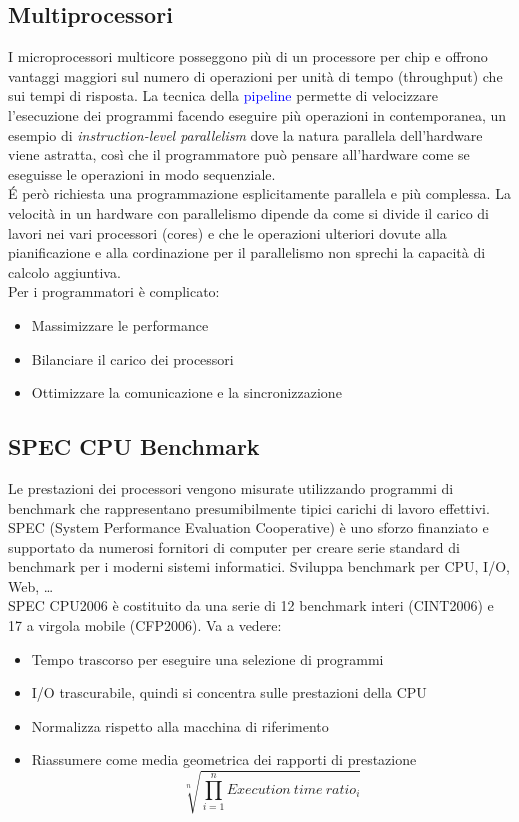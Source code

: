 \documentclass[12pt,a4paper]{article}
\begin{document}
\subsection{Multiprocessori}
I microprocessori multicore posseggono più di un processore per chip e offrono vantaggi maggiori sul numero di operazioni per unità di tempo (throughput) che sui tempi di risposta. La tecnica della \textcolor{blue}{pipeline} permette di velocizzare l'esecuzione dei programmi facendo eseguire più operazioni in contemporanea, un esempio di \textit{instruction-level parallelism} dove la natura parallela dell'hardware viene astratta, così che il programmatore può pensare all'hardware come se eseguisse le operazioni in modo sequenziale. \\
\'E però richiesta una programmazione esplicitamente parallela e più complessa. La velocità in un hardware con parallelismo dipende da come si divide il carico di lavori nei vari processori (cores) e che le operazioni ulteriori dovute alla pianificazione e alla cordinazione per il parallelismo non sprechi la capacità di calcolo aggiuntiva.\\
Per i programmatori è complicato:\begin{itemize}
\item Massimizzare le performance
\item Bilanciare il carico dei processori
\item Ottimizzare la comunicazione e la sincronizzazione
\end{itemize}

\subsection{SPEC CPU Benchmark}
Le prestazioni dei processori vengono misurate utilizzando programmi di benchmark che rappresentano presumibilmente tipici carichi di lavoro effettivi.\\
SPEC (System Performance Evaluation Cooperative) è uno sforzo finanziato e supportato da numerosi fornitori di computer per creare serie standard di benchmark per i moderni sistemi informatici. Sviluppa benchmark per CPU, I/O, Web, \dots \\
SPEC CPU2006 è costituito da una serie di 12 benchmark interi (CINT2006) e 17 a virgola mobile (CFP2006). Va a vedere:
\begin{itemize}
\item Tempo trascorso per eseguire una selezione di programmi
\item I/O trascurabile, quindi si concentra sulle prestazioni della CPU
\item Normalizza rispetto alla macchina di riferimento
\item Riassumere come media geometrica dei rapporti di prestazione
$$\sqrt[n]{\prod_{i=1}^n Execution\ time\ ratio_i}$$
\end{itemize}
\end{document}
